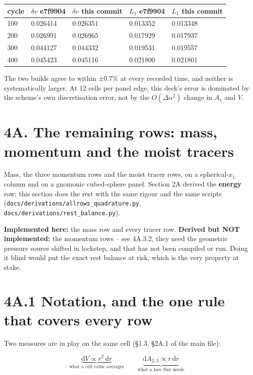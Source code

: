 \documentclass[11pt,a4paper]{article}
\begin{document}
\begin{longtable}{lllll}
\toprule
cycle & $\delta v$ e7f9904 & $\delta v$ this commit & $L_1$ e7f9904 & $L_1$ this commit \\
\midrule
100 & 0.026414 & 0.026351 & 0.013352 & 0.013348 \\
200 & 0.026991 & 0.026965 & 0.017929 & 0.017937 \\
300 & 0.044127 & 0.044332 & 0.019531 & 0.019557 \\
400 & 0.045423 & 0.045116 & 0.021800 & 0.021801 \\
\bottomrule
\end{longtable}

The two builds agree to within ±0.7\% at every recorded time, and neither is systematically larger. At 12 cells per
panel edge, this deck's error is dominated by the scheme's own discretisation error, not by the $O(\Delta\alpha^2)$
change in $A_1$ and $V$.

\hrulefill

\section*{4A. The remaining rows: mass, momentum and the moist tracers}

Mass, the three momentum rows and the moist tracer rows, on a spherical-$x_1$
column and on a gnomonic cubed-sphere panel. Section 2A derived the \textbf{energy}
row; this section does the rest with the same rigour and the same scripts
(\texttt{docs/derivations/allrows\_quadrature.py}, \texttt{docs/derivations/rest\_balance.py}).

\textbf{Implemented here:} the mass row and every tracer row.
\textbf{Derived but NOT implemented:} the momentum rows -- see 4A.3.2, they need the
geometric pressure source shifted in lockstep, and that has not been compiled
or run. Doing it blind would put the exact rest balance at risk, which is the
very property at stake.

\section*{4A.1 Notation, and the one rule that covers every row}

Two measures are in play on the same cell (§1.3, §2A.1 of the main file):

\begin{equation*}
\underbrace{\mathrm{d}V \propto r^2\,\mathrm{d}r}_{\text{what a cell value averages}}
\qquad
\underbrace{\mathrm{d}A_{2,3} \propto r\,\mathrm{d}r}_{\text{what a face flux needs}}
\end{equation*}
\end{document}
